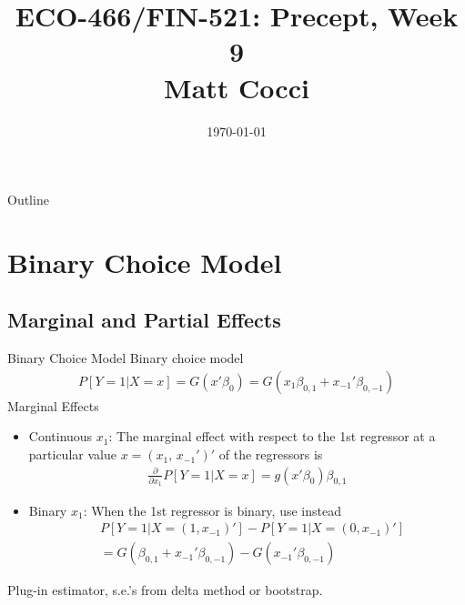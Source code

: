 \documentclass[handout]{beamer}
\title[]{ECO-466/FIN-521: Precept, Week 9 \\ Matt Cocci}
\author[]{}
\date{\today}
\begin{document}
\begin{frame}[plain]
\titlepage
\end{frame}


\begin{frame}{Outline}
\tableofcontents[hideallsubsections]
\end{frame}


\section{Binary Choice Model}

\subsection{Marginal and Partial Effects}

\begin{frame}[shrink]{Binary Choice Model}
Binary choice model
\begin{align*}
  P[Y=1|X=x]
  =
  G(x'\beta_0)
  =
  G(x_1\beta_{0,1} + x_{-1}'\beta_{0,-1})
\end{align*}
\alert{Marginal Effects}
\begin{itemize}
  \item \alert{Continuous $x_1$}:
    The marginal effect with respect to the 1st regressor at a
    particular value $x=(x_1,\,x_{-1}')'$ of the regressors is
    \begin{align*}
      \frac{\partial}{\partial x_1}
      P[Y=1|X=x]
      =
      g(x'\beta_0)\beta_{0,1}
    \end{align*}

  \item \alert{Binary $x_1$}:
    When the 1st regressor is binary, use instead
    \begin{align*}
      &
      P[Y=1|X=(1,x_{-1})']
      -
      P[Y=1|X=(0,x_{-1})']
      \\
      &=
      G(\beta_{0,1} + x_{-1}'\beta_{0,-1})
      -
      G(x_{-1}'\beta_{0,-1})
    \end{align*}

\end{itemize}
Plug-in estimator, s.e.'s from delta method or bootstrap.
\end{frame}
\end{document}
